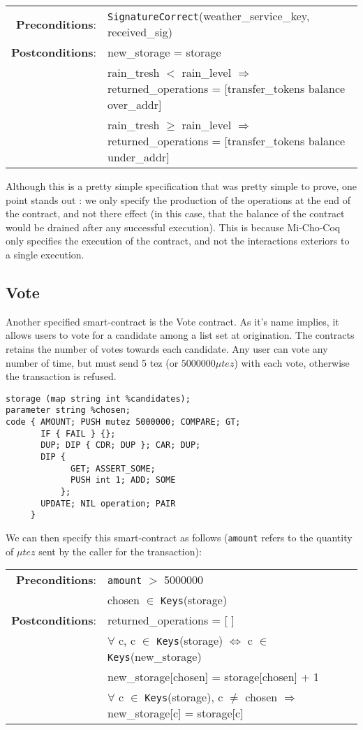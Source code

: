 \documentclass{report}
\begin{document}
{\small
\begin{longtable}{rl}
  \textbf{Preconditions}: & \texttt{SignatureCorrect}(weather\_service\_key, received\_sig)\\
  \textbf{Postconditions}: & new\_storage = storage\\
  & rain\_tresh $<$ rain\_level $\Rightarrow$ returned\_operations = [transfer\_tokens balance over\_addr]\\
  & rain\_tresh $\ge$ rain\_level $\Rightarrow$ returned\_operations = [transfer\_tokens balance under\_addr]\\
\end{longtable}}

Although this is a pretty simple specification that was pretty simple to prove, one point stands out : we only specify the production of the operations at the end of the contract, and not there effect (in this case, that the balance of the contract would be drained after any successful execution). This is because Mi-Cho-Coq only specifies the execution of the contract, and not the interactions exteriors to a single execution.

\subsection{Vote}

Another specified smart-contract is the Vote contract. As it's name implies, it allows users to vote for a candidate among a list set at origination. The contracts retains the number of votes towards each candidate. Any user can vote any number of time, but must send 5 tez (or $5000000\mu tez$) with each vote, otherwise the transaction is refused.

\begin{lstlisting}[language=michelson]
storage (map string int %candidates);
parameter string %chosen;
code { AMOUNT; PUSH mutez 5000000; COMPARE; GT;
       IF { FAIL } {};
       DUP; DIP { CDR; DUP }; CAR; DUP;
       DIP {
             GET; ASSERT_SOME;
             PUSH int 1; ADD; SOME
           };
       UPDATE; NIL operation; PAIR
     }
\end{lstlisting}

We can then specify this smart-contract as follows (\texttt{amount} refers to the quantity of $\mu tez$ sent by the caller for the transaction):
{\small
\begin{longtable}{rl}
  \textbf{Preconditions}: & \texttt{amount} $>$ 5000000\\
  & chosen $\in$ \texttt{Keys}(storage)\\
  \textbf{Postconditions}: & returned\_operations = [ ]\\
  & $\forall$ c, c $\in$ \texttt{Keys}(storage) $\iff$ c $\in$ \texttt{Keys}(new\_storage)\\
  & new\_storage[chosen] = storage[chosen] + 1\\
  & $\forall$ c $\in$ \texttt{Keys}(storage), c $\neq$ chosen $\Rightarrow$ new\_storage[c] = storage[c]
\end{longtable}}
\end{document}
